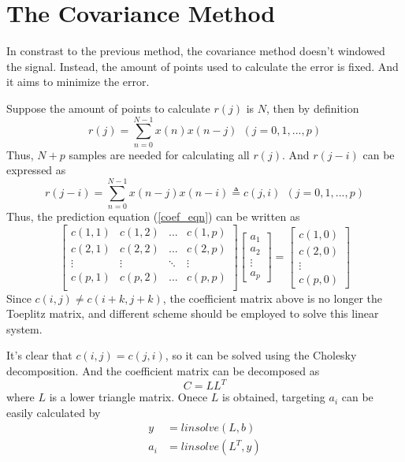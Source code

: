 \documentclass[preprint,12pt]{elsarticle}
\begin{document}
\section{The Covariance Method}
In constrast to the previous method, the covariance method doesn't windowed the signal. Instead, the amount of points used to calculate the error is fixed. And it aims to minimize the error.

Suppose the amount of points to calculate $r(j)$ is $N$, then by definition
\begin{equation}
	r(j) = \sum_{n=0}^{N-1}x(n)x(n-j) \ \ (j = 0, 1, ... , p)
\end{equation}
Thus, $N+p$ samples are needed for calculating all $r(j)$. And $r(j-i)$ can be expressed as 
\begin{equation}
	r(j-i) = \sum_{n=0}^{N-1} x(n-j)x(n-i) \triangleq c(j, i) \ \ (j = 0, 1, ... , p) 
\end{equation}
Thus, the prediction equation (\ref{coef_eqn}) can be written as
\begin{equation}
	\begin{bmatrix}
		c(1, 1) & c(1, 2) & ... & c(1, p)\\
		c(2, 1) & c(2, 2) & ... & c(2, p)\\
		\vdots  & \vdots  & \ddots & \vdots\\
		c(p, 1) & c(p, 2) & ... & c(p, p)\\
	\end{bmatrix}
	\begin{bmatrix}
		a_1 \\ a_2 \\ \vdots \\ a_p
	\end{bmatrix}
	=
	\begin{bmatrix}
		c(1, 0) \\ c(2, 0) \\ \vdots \\ c(p, 0)
	\end{bmatrix}
\end{equation}
Since $c(i, j) \neq c(i+k, j+k)$, the coefficient matrix above is no longer the Toeplitz matrix, and different scheme should be employed to solve this linear system.

It's clear that $c(i, j) = c(j, i)$, so it can be solved using the Cholesky decomposition. And the coefficient matrix can be decomposed as
\begin{equation}
	C = L L^T
\end{equation}
where $L$ is a lower triangle matrix. Onece $L$ is obtained, targeting $a_i$ can be easily calculated by
\begin{equation}
	\begin{aligned}
		y & = linsolve(L, b)\\
		{a_i} & = linsolve(L^T, y)
	\end{aligned}
\end{equation}
\end{document}

